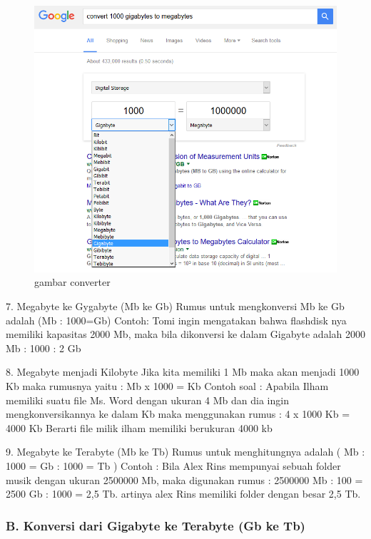 \begin{figure}[ht]
\centerline{\includegraphics[width=1\textwidth]{figures/converter.png}}
\caption{gambar converter}
\label{converter}
\end{figure}

7.	Megabyte ke Gygabyte (Mb ke Gb)
	Rumus untuk mengkonversi Mb ke Gb adalah (Mb : 1000=Gb)
	Contoh: 
	Tomi ingin mengatakan bahwa flashdisk nya memiliki kapasitas 2000 Mb, maka bila dikonversi  ke dalam Gigabyte adalah 2000 Mb : 1000 : 2 Gb 

8.	Megabyte menjadi Kilobyte
Jika kita memiliki 1 Mb maka akan menjadi 1000 Kb maka rumusnya yaitu :
Mb x 1000 = Kb
Contoh soal :
Apabila Ilham memiliki suatu file Ms. Word dengan ukuran 4 Mb dan dia ingin mengkonversikannya ke dalam Kb maka menggunakan rumus :
4 x 1000 Kb = 4000 Kb
Berarti file milik ilham memiliki berukuran 4000 kb

9.	Megabyte ke Terabyte (Mb ke Tb)
Rumus untuk menghitungnya adalah ( Mb : 1000 = Gb : 1000 = Tb )
Contoh :
Bila Alex Rins mempunyai sebuah folder musik dengan ukuran 2500000 Mb, maka digunakan rumus : 2500000 Mb : 100 = 2500 Gb : 1000 = 2,5 Tb.
artinya alex Rins memiliki folder dengan besar 2,5 Tb.

\subsubsection {B.	Konversi dari Gigabyte ke Terabyte (Gb ke Tb)}


